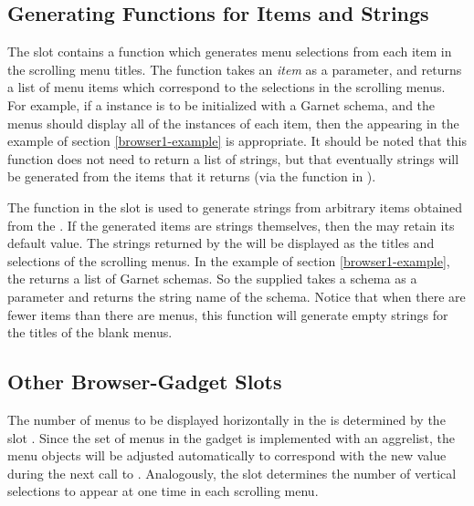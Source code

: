\subsection{Generating Functions for Items and Strings}
\label{gen-fns}

 The slot
 contains a function which
generates menu selections from each item in the scrolling menu titles.
The function takes an {\it item} as a parameter, and returns a list of
menu items which correspond to the selections in the scrolling menus.
For example, if a  instance is to be initialized
with a Garnet schema, and the menus should display all of the
instances of each item, then the 
appearing in the example of section \ref{browser1-example} is
appropriate.  It should be noted that this function does not need to
return a list of strings, but that eventually strings will be
generated from the items that it returns (via the function in
).

 The function in the slot
 is used to generate strings from
arbitrary items obtained from the
.  If the generated items are
strings themselves, then the  may retain
its default value.  The strings returned by the
 will be displayed as the titles and
selections of the scrolling menus.  In the example of section
\ref{browser1-example}, the 
returns a list of Garnet schemas.  So the supplied
 takes a schema as a parameter and
returns the string name of the schema.  Notice that when there are
fewer items than there are menus, this function will generate empty
strings for the titles of the blank menus.



\subsection{Other Browser-Gadget Slots}
The number of menus to be
displayed horizontally in the  is determined by the
slot .  Since the set of menus in the gadget is
implemented with an aggrelist, the menu objects will be adjusted automatically
to correspond with the new value during the next call to .
Analogously, the slot  determines the number of vertical
selections to appear at one time in each scrolling menu.

